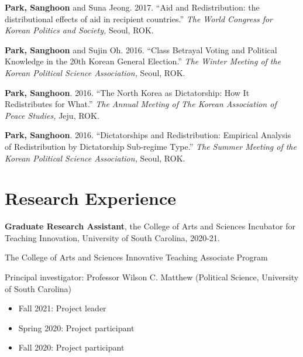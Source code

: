 \documentclass[margin,line]{res}
\begin{document}
\begin{resume}
\vspace{-.25cm}
{\bf Park, Sanghoon} and Suna Jeong. {2017.} {``Aid and Redistribution: the distributional effects of aid in recipient countries.''} {\it The World Congress for Korean Politics and Society,} Seoul, ROK.

\vspace{-.25cm}
{\bf Park, Sanghoon} and Sujin Oh. {2016.} {``Class Betrayal Voting and Political Knowledge in the 20th Korean General Election.''} {\it The Winter Meeting of the Korean Political Science Association,} Seoul, ROK.

\vspace{-.25cm}
{\bf Park, Sanghoon}. {2016.} {``The North Korea as Dictatorship: How It Redistributes for What.''} {\it The Annual Meeting of The Korean Association of Peace Studies,} Jeju, ROK.

\vspace{-.25cm}
{\bf Park, Sanghoon}. {2016.} {``Dictatorships and Redistribution: Empirical Analysis of Redistribution by Dictatorship Sub-regime Type.''} {\it The Summer Meeting of the Korean Political Science Association,} Seoul, ROK.

\section{\sc Research Experience}



{\bf Graduate Research Assistant}, the College of Arts and Sciences Incubator for Teaching Innovation, University of South Carolina, 2020-21.

\vspace{-.43cm}

The College of Arts and Sciences Innovative Teaching Associate Program 

\vspace{-.43cm}

Principal investigator:  Professor Wilson C. Matthew \small{(Political Science, University of South Carolina)}
\vspace{-.43cm}
\begin{itemize}
	\item[] Fall 2021: Project leader
	\item[] Spring 2020: Project participant
	\item[] Fall 2020: Project participant
\end{itemize}


\end{resume}
\end{document}
